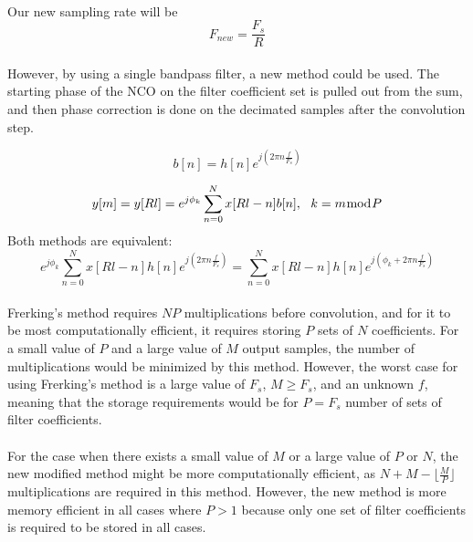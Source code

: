 \documentclass{article}
\begin{document}
        \paragraph{} 
        Our new sampling rate will be
        \begin{equation}
            {F}_{new} = \frac{{F}_{s}}{R}
        \end{equation}
        
        \paragraph{}    
        However, by using a single bandpass filter, a new method could be used. The starting phase of the NCO on the filter coefficient set is pulled out from the sum, and then phase correction is done on the decimated samples after the convolution step.
                
        \begin{equation}
            {{b}[n]} = h[n]e^{j({2{\pi}n\frac{f}{{F}_s}})}
        \end{equation}

        \begin{equation}
            {y[m]} = {y[Rl]} = e^{j{\phi}_k} \sum\limits_{n=0}^N x[Rl-n]{b[n]},\ \ k = m{\bmod}P
        \end{equation} 
        Both methods are equivalent:
        \begin{equation}   
            e^{j{\phi}_k} \sum\limits_{n=0}^N x[Rl-n]h[n]e^{j(2{\pi}n\frac{f}{{F}_s})} = \sum\limits_{n=0}^N x[Rl-n]h[n]e^{j({\phi}_k + 2{\pi}n\frac{f}{{F}_s})}
        \end{equation}
        
        \paragraph{}
        
        Frerking's method requires $NP$ multiplications before convolution, and for it to be most computationally efficient, it requires storing $P$ sets of $N$ coefficients. For a small value of $P$ and a large value of $M$ output samples, the number of multiplications would be minimized by this method. However, the worst case for using Frerking's method is a large value of ${F}_s$, $M \ge {F}_s$, and an unknown $f$, meaning that the storage requirements would be for $P = {F}_s$ number of sets of filter coefficients.
        \paragraph{}
        For the case when there exists a small value of $M$ or a large value of $P$ or $N$, the new modified method might be more computationally efficient, as $N + M - \lfloor {\frac{M}{P}} \rfloor $ multiplications are required in this method. However, the new method is more memory efficient in all cases where $P > 1$ because only one set of filter coefficients is required to be stored in all cases.
\end{document}
